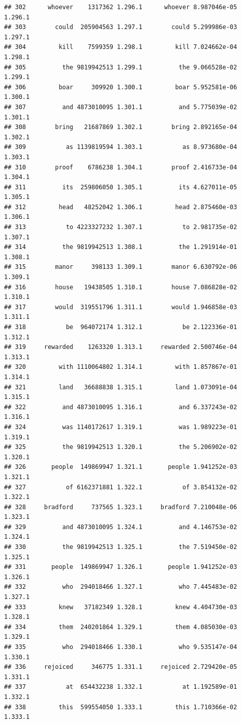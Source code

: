 \documentclass{article}\usepackage[]{graphicx}\usepackage[]{color}
\makeatletter
\newenvironment{kframe}{%
 \def\at@end@of@kframe{}%
 \ifinner\ifhmode%
  \def\at@end@of@kframe{\end{minipage}}%
  \begin{minipage}{\columnwidth}%
 \fi\fi%
 \def\FrameCommand##1{\hskip\@totalleftmargin \hskip-\fboxsep
 \colorbox{shadecolor}{##1}\hskip-\fboxsep
     \hskip-\linewidth \hskip-\@totalleftmargin \hskip\columnwidth}%
 \MakeFramed {\advance\hsize-\width
   \@totalleftmargin\z@ \linewidth\hsize
   \@setminipage}}%
 {\par\unskip\endMakeFramed%
 \at@end@of@kframe}
\newenvironment{knitrout}{}{} %
\makeatother
\begin{document}
\begin{knitrout}
\begin{kframe}
\begin{verbatim}
## 302      whoever    1317362 1.296.1      whoever 8.987046e-05 1.296.1
## 303        could  205904563 1.297.1        could 5.299986e-03 1.297.1
## 304         kill    7599359 1.298.1         kill 7.024662e-04 1.298.1
## 305          the 9819942513 1.299.1          the 9.066528e-02 1.299.1
## 306         boar     309920 1.300.1         boar 5.952581e-06 1.300.1
## 307          and 4873010095 1.301.1          and 5.775039e-02 1.301.1
## 308        bring   21687869 1.302.1        bring 2.892165e-04 1.302.1
## 309           as 1139819594 1.303.1           as 8.973680e-04 1.303.1
## 310        proof    6786238 1.304.1        proof 2.416733e-04 1.304.1
## 311          its  259806050 1.305.1          its 4.627011e-05 1.305.1
## 312         head   48252042 1.306.1         head 2.875460e-03 1.306.1
## 313           to 4223327232 1.307.1           to 2.981735e-02 1.307.1
## 314          the 9819942513 1.308.1          the 1.291914e-01 1.308.1
## 315        manor     398133 1.309.1        manor 6.630792e-06 1.309.1
## 316        house   19438505 1.310.1        house 7.086828e-02 1.310.1
## 317        would  319551796 1.311.1        would 1.946858e-03 1.311.1
## 318           be  964072174 1.312.1           be 2.122336e-01 1.312.1
## 319     rewarded    1263320 1.313.1     rewarded 2.500746e-04 1.313.1
## 320         with 1110064802 1.314.1         with 1.857867e-01 1.314.1
## 321         land   36688838 1.315.1         land 1.073091e-04 1.315.1
## 322          and 4873010095 1.316.1          and 6.337243e-02 1.316.1
## 324          was 1140172617 1.319.1          was 1.989223e-01 1.319.1
## 325          the 9819942513 1.320.1          the 5.206902e-02 1.320.1
## 326       people  149869947 1.321.1       people 1.941252e-03 1.321.1
## 327           of 6162371881 1.322.1           of 3.854132e-02 1.322.1
## 328     bradford     737565 1.323.1     bradford 7.210048e-06 1.323.1
## 329          and 4873010095 1.324.1          and 4.146753e-02 1.324.1
## 330          the 9819942513 1.325.1          the 7.519450e-02 1.325.1
## 331       people  149869947 1.326.1       people 1.941252e-03 1.326.1
## 332          who  294018466 1.327.1          who 7.445483e-02 1.327.1
## 333         knew   37182349 1.328.1         knew 4.404730e-03 1.328.1
## 334         them  240201864 1.329.1         them 4.085030e-03 1.329.1
## 335          who  294018466 1.330.1          who 9.535147e-04 1.330.1
## 336     rejoiced     346775 1.331.1     rejoiced 2.729420e-05 1.331.1
## 337           at  654432238 1.332.1           at 1.192589e-01 1.332.1
## 338         this  599554050 1.333.1         this 1.710366e-02 1.333.1

\end{verbatim}
\end{kframe}
\end{knitrout}
\end{document}
